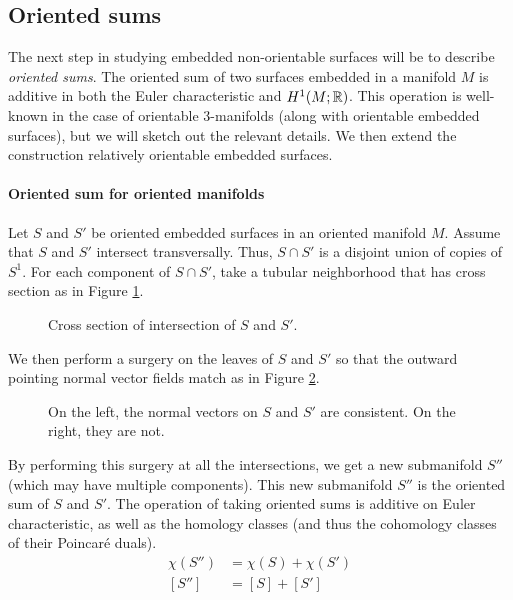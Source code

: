\subsection{Oriented sums}
\label{sec:oriented-sums}

The next step in studying embedded non-orientable surfaces will be to describe \emph{oriented sums}.
The oriented sum of two surfaces embedded in a manifold $M$ is additive in both the Euler characteristic and $H^1(M;\mathbb{R})$.
This operation is well-known in the case of orientable $3$-manifolds (along with orientable embedded surfaces), but we will sketch out the relevant details.
We then extend the construction relatively orientable embedded surfaces.

\paragraph{Oriented sum for oriented manifolds}

Let $S$ and $S'$ be oriented embedded surfaces in an oriented manifold $M$.
Assume that $S$ and $S'$ intersect transversally.
Thus, $S \cap S'$ is a disjoint union of copies of $S^1$.
For each component of $S\cap S'$, take a tubular neighborhood that has cross section as in Figure \ref{fig:cross-section}.

\begin{figure}
  \centering
  \caption{Cross section of intersection of $S$ and $S'$.}
  \label{fig:cross-section}
\end{figure}

We then perform a surgery on the leaves of $S$ and $S'$ so that the outward pointing normal vector fields match as in Figure \ref{fig:surgery}.
\begin{figure}
  \centering
  \caption{On the left, the normal vectors on $S$ and $S'$ are consistent. On the right, they are not.}
  \label{fig:surgery}
\end{figure}

By performing this surgery at all the intersections, we get a new submanifold $S''$ (which may have multiple components).
This new submanifold $S''$ is the oriented sum of $S$ and $S'$.
The operation of taking oriented sums is additive on Euler characteristic, as well as the homology classes (and thus the cohomology classes of their Poincar\'e duals).
\begin{align*}
  \chi(S'') &= \chi(S) + \chi(S') \\
  [S''] &= [S] + [S'] \\
\end{align*}


